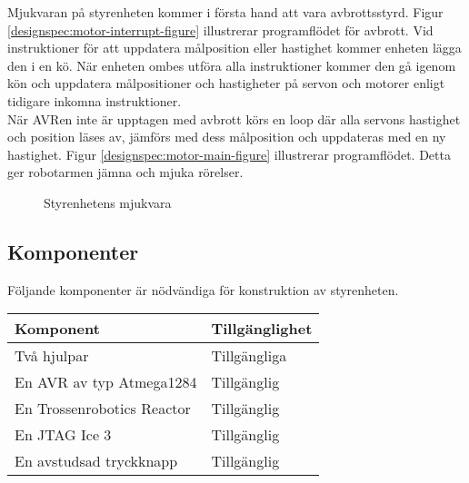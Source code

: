 Mjukvaran på styrenheten kommer i första hand att vara avbrottsstyrd. Figur \ref{designspec:motor-interrupt-figure} illustrerar programflödet för avbrott. Vid instruktioner för att uppdatera målposition eller hastighet kommer enheten lägga den i en kö. När enheten ombes utföra alla instruktioner kommer den gå igenom kön och uppdatera målpositioner och hastigheter på servon och motorer enligt tidigare inkomna instruktioner. \\
När AVRen inte är upptagen med avbrott körs en loop där alla servons hastighet och position läses av, jämförs med dess målposition och uppdateras med en ny hastighet. Figur \ref{designspec:motor-main-figure} illustrerar programflödet. Detta ger robotarmen jämna och mjuka rörelser. \\

\begin{figure}[H]
\centering
\begin{minipage}[b]{.5\linewidth}
\centering
\scalebox{0.7}{}
\label{designspec:motor-interrupt-figure}
\end{minipage}%
\begin{minipage}[b]{.5\linewidth}
\centering
\scalebox{0.6}{}
\label{designspec:motor-main-figure}
\end{minipage}
\caption{Styrenhetens mjukvara}\label{fig:1}
\end{figure}

\subsection{Komponenter}
Följande komponenter är nödvändiga för konstruktion av styrenheten. \\
\begin{tabularx}{\textwidth}{| l | X |}
	\hline
	{\textbf{Komponent}} & {\textbf{Tillgänglighet}} \\\hline
	{Två hjulpar} & {Tillgängliga} \\\hline
	{En AVR av typ Atmega1284} & {Tillgänglig} \\\hline
	{En Trossenrobotics Reactor} & {Tillgänglig} \\\hline
	{En JTAG Ice 3} & {Tillgänglig} \\\hline
	{En avstudsad tryckknapp} & {Tillgänglig} \\\hline
\end{tabularx}
